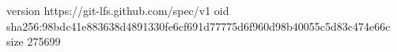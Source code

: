 version https://git-lfs.github.com/spec/v1
oid sha256:98bdc41e883638d4891330fe6cf691d77775d6f960d98b40055c5d83c474e66c
size 275699
